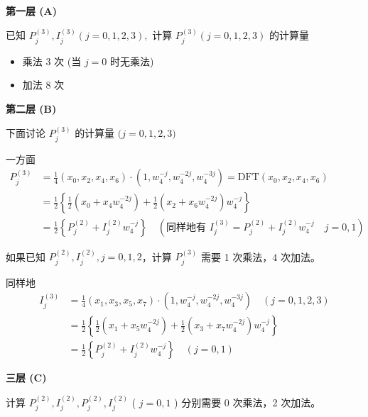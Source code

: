 \documentclass[12pt,a4paper]{article}
\numberwithin{subsection}{section}   %
\numberwithin{subsubsection}{subsection}
\theoremstyle{plain}
\theoremstyle{definition}
\theoremstyle{remark}
\theoremstyle{remark}
\begin{document}
\textbf{第一层 (A)}
	

	$	\text{已知 } P_{j}^{(3)}, I_{j}^{(3)} (j=0,1,2,3), \text{ 计算 } P_{j}^{(3)} (j=0,1,2,3) \text{ 的计算量}$

	
	\begin{itemize}
		\item 乘法 3 次 (当 $j=0$ 时无乘法)
		\item 加法 8 次
	\end{itemize}
	
\textbf{第二层 (B)}
	

		$\text{下面讨论 } P_{j}^{(3)} \text{ 的计算量 (} j=0,1,2,3 \text{)}$

	
	一方面
	\begin{equation}
		\begin{aligned}
			P_{j}^{(3)} &= \frac{1}{4} \left( x_{0}, x_{2}, x_{4}, x_{6} \right) \cdot (1, w_{4}^{-j}, w_{4}^{-2j}, w_{4}^{-3j}) = \text{DFT} \left( x_{0}, x_{2}, x_{4}, x_{6} \right) \\[8pt]
			&= \frac{1}{2} \left\{ \frac{1}{2} \left( x_{0} + x_{4} w_{4}^{-2j} \right) + \frac{1}{2} \left( x_{2} + x_{6} w_{4}^{-2j} \right) w_{4}^{-j} \right\} \\[8pt]
			&= \frac{1}{2} \left\{ P_{j}^{(2)} + I_{j}^{(2)} w_{4}^{-j} \right\} \quad ( \text{同样地有 } I_{j}^{(3)} = P_{j}^{(2)} + I_{j}^{(2)} w_{4}^{-j} \quad j=0,1 )
		\end{aligned}
	\end{equation}
	
	如果已知 $P_{j}^{(2)}, I_{j}^{(2)}, j=0,1,2$，计算 $P_{j}^{(3)}$ 需要 1 次乘法，4 次加法。
	
	同样地
	\begin{equation}
		\begin{aligned}
			I_{j}^{(3)} &= \frac{1}{4} \left( x_{1}, x_{3}, x_{5}, x_{7} \right) \cdot (1, w_{4}^{-j}, w_{4}^{-2j}, w_{4}^{-3j}) \quad (j=0,1,2,3) \\[8pt]
			&= \frac{1}{2} \left\{ \frac{1}{2} \left( x_{1} + x_{5} w_{4}^{-2j} \right) + \frac{1}{2} \left( x_{3} + x_{7} w_{4}^{-2j} \right) w_{4}^{-j} \right\} \\[8pt]
			&= \frac{1}{2} \left\{ P_{j}^{(2)} + I_{j}^{(2)} w_{4}^{-j} \right\} \quad (j=0,1)
		\end{aligned}
	\end{equation}
	
	\textbf{三层 (C)}
	
	计算 $P_{j}^{(2)}, I_{j}^{(2)}, P_{j}^{(2)}, I_{j}^{(2)}$ ( $j=0,1$ ) 分别需要 0 次乘法，2 次加法。
	
\end{document}
